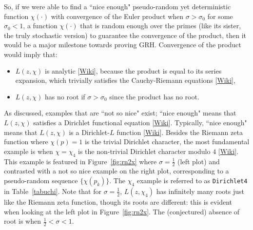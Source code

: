 \documentclass[oneside,10pt]{book}
\begin{document}
So, if we were able to find a ``nice enough" pseudo-random yet deterministic function $\chi(\cdot)$ with convergence of the 
 Euler product when $\sigma>\sigma_0$ for some $\sigma_0<1$, a function $\chi(\cdot)$ that is random enough over the primes (like its sister, the truly stochastic version) to guarantee the convergence of the product, then it would be a major milestone towards proving GRH. Convergence of the product would imply that:
\begin{itemize} 
\item $L(z,\chi)$ is \textcolor{index}{analytic} [\href{https://en.wikipedia.org/wiki/Analytic_function}{Wiki}], because  the product is equal to its series expansion, which trivially satisfies the \textcolor{index}{Cauchy-Riemann equations} [\href{https://en.wikipedia.org/wiki/Cauchy\%E2\%80\%93Riemann_equations}{Wiki}],
\item $L(z,\chi)$ has no root if $\sigma>\sigma_0$ since the product has no root.
\end{itemize}
As discussed, examples that are ``not so nice" exist; ``nice enough" means that $L(z,\chi)$ satisfies a
 \textcolor{index}{Dirichlet functional equation} [\href{https://en.wikipedia.org/wiki/Functional_equation_(L-function)}{Wiki}]. Typically, ``nice enough" 
 means that $L(z,\chi)$ is a \textcolor{index}{Dirichlet-$L$ function} [\href{https://en.wikipedia.org/wiki/Dirichlet_L-function}{Wiki}]. Besides the \textcolor{index}{Riemann zeta function} where $\chi(p)=1$ is the trivial Dirichlet character, the most 
 fundamental example is when $\chi=\chi_4$ is the non-trivial \textcolor{index}{Dirichlet character modulo $4$} [\href{https://en.wikipedia.org/wiki/Dirichlet_character}{Wiki}]. This example is featured in Figure~\ref{fig:rn2x} where $\sigma=\frac{1}{2}$ (left plot) and contrasted with a not so nice example on the right plot, corresponding to a pseudo-random sequence $\{\chi(p_k)\}$. The $\chi_4$ example 
 is referred to as \texttt{Dirichlet4} in Table~\ref{tabuchi}. Note that for $\sigma=\frac{1}{2}$, $L(z,\chi_4)$ has infinitely many roots just like the Riemann zeta function, though its roots are different: this is evident when looking at the left plot in Figure~\ref{fig:rn2x}. The (conjectured) absence of root is when $\frac{1}{2}<\sigma<1$.
\end{document}
